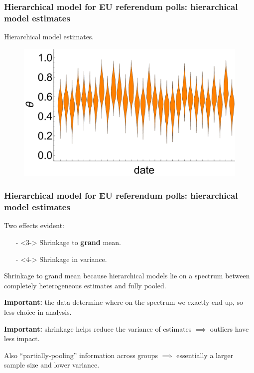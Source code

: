 \documentclass[handout]{beamer}
\begin{document}
\begin{frame}[fragile]
	\frametitle{Hierarchical model for EU referendum polls: hierarchical model estimates}
	 Hierarchical model estimates.
	
	\begin{figure}[ht]
		\centerline{\includegraphics[width=1\textwidth]{figures/lec6_euHierarchicalPosterior.pdf}}
	\end{figure}
	
\end{frame}

\begin{frame}[fragile]
	\frametitle{Hierarchical model for EU referendum polls: hierarchical model estimates}
	 Two effects evident:
	
	\begin{itemize}
		\item[-]<3-> Shrinkage to \textbf{grand} mean.
		\item[-]<4-> Shrinkage in variance.
	\end{itemize}
	
	 Shrinkage to grand mean because hierarchical models lie on a spectrum between completely heterogeneous estimates and fully pooled.
	
	\textbf{Important:} the data determine where on the spectrum we exactly end up, so less choice in analysis.
	
	\textbf{Important:} shrinkage helps reduce the variance of estimates $\implies$ outliers have less impact.
	
	\vspace{0.2cm}
	
	Also ``partially-pooling'' information across groups $\implies$ essentially a larger sample size and lower variance. 
	
	
\end{frame}
\end{document}
